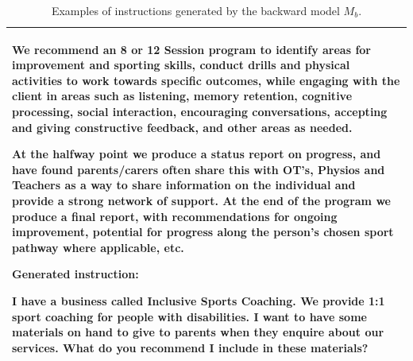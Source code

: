 \begin{table}[t]
\begin{tabular}{l}
\begin{minipage}{40em}
\begin{lmttfont}
We recommend an 8 or 12 Session program to identify areas for improvement and sporting skills, conduct drills and physical activities to work towards specific outcomes, while engaging with the client in areas such as listening, memory retention, cognitive processing, social interaction, encouraging conversations, accepting and giving constructive feedback, and other areas as needed.

At the halfway point we produce a status report on progress, and have found parents/carers often share this with OT's, Physios and Teachers as a way to share information on the individual and provide a strong network of support. At the end of the program we produce a final report, with recommendations for ongoing improvement, potential for progress along the person's chosen sport pathway where applicable, etc.
\end{lmttfont}

\textbf{Generated instruction:}
\begin{lmttfont}
I have a business called Inclusive Sports Coaching. We provide 1:1 sport coaching for people with disabilities. I want to have some materials on hand to give to parents when they enquire about our services. What do you recommend I include in these materials?
\end{lmttfont}
\end{minipage}\\
    \bottomrule
  \end{tabular}
  \vspace{2mm}
  \caption{Examples of instructions generated by the backward model $M_b$.
    \label{tab:instruction_sample_1}
  }
\end{table}


